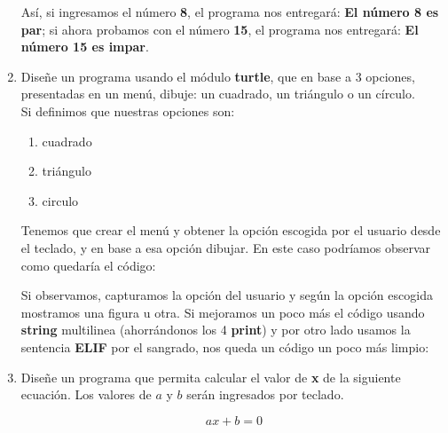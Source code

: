 \begin{enumerate}[{Ejercicio} 1.]
    \begin{listing}[H]
    \end{listing}

    Así, si ingresamos el número \textbf{8}, el programa nos entregará: \textbf{El número 8 es par}; si ahora probamos con el número \textbf{15}, el programa nos entregará: \textbf{El número 15 es impar}.

    \item Diseñe un programa usando el módulo \textbf{turtle}, que en base a 3 opciones, presentadas en un menú, dibuje: un cuadrado, un triángulo o un círculo.\\
    
    \asw Si definimos que nuestras opciones son:

    \begin{enumerate}
        \item cuadrado
        \item triángulo
        \item circulo
    \end{enumerate}

    Tenemos que crear el menú y obtener la opción escogida por el usuario desde el teclado, y en base a esa opción dibujar. En este caso podríamos observar como quedaría el código:\\

    \begin{listing}[H]
    \end{listing}

    Si observamos, capturamos la opción del usuario y según la opción escogida mostramos una figura u otra. Si mejoramos un poco más el código usando \textbf{string} multilinea (ahorrándonos los 4 \textbf{print}) y por otro lado usamos la sentencia \textbf{ELIF} por el sangrado, nos queda un código un poco más limpio:\\

    \begin{listing}[H]
    \end{listing}

    \item Diseñe un programa que permita calcular el valor de \textbf{x} de la siguiente ecuación. Los valores de \(a\) y \(b\) serán ingresados por teclado.
    
    \[ ax + b = 0 \]


\end{enumerate}
